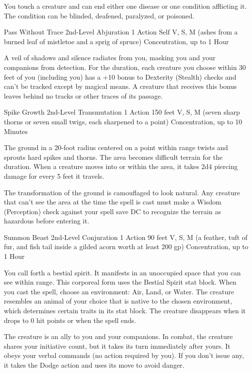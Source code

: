 {You touch a creature and can end either one disease or one condition afflicting it. The condition can be blinded, deafened, paralyzed, or poisoned.

\DndSpellHeader
  {Pass Without Trace}
  {2nd-Level Abjuration}
  {1 Action}
  {Self}
  {V, S, M (ashes from a burned leaf of mistletoe and a sprig of spruce)}
  {Concentration, up to 1 Hour}

A veil of shadows and silence radiates from you, masking you and your companions from detection. For the duration, each creature you choose within 30 feet of you (including you) has a +10 bonus to Dexterity (Stealth) checks and can’t be tracked except by magical means. A creature that receives this bonus leaves behind no tracks or other traces of its passage.

\DndSpellHeader
  {Spike Growth}
  {2nd-Level Transmutation}
  {1 Action}
  {150 feet}
  {V, S, M (seven sharp thorns or seven small twigs, each sharpened to a point)}
  {Concentration, up to 10 Minutes}

The ground in a 20-foot radius centered on a point within range twists and sprouts hard spikes and thorns. The area becomes difficult terrain for the duration. When a creature moves into or within the area, it takes 2d4 piercing damage for every 5 feet it travels.

The transformation of the ground is camouflaged to look natural. Any creature that can’t see the area at the time the spell is cast must make a Wisdom (Perception) check against your spell save DC to recognize the terrain as hazardous before entering it.

\DndSpellHeader
  {Summon Beast}
  {2nd-Level Conjuration}
  {1 Action}
  {90 feet}
  {V, S, M (a feather, tuft of fur, and fish tail inside a gilded acorn worth at least 200 gp)}
  {Concentration, up to 1 Hour}

You call forth a bestial spirit. It manifests in an unoccupied space that you can see within range. This corporeal form uses the Bestial Spirit stat block. When you cast the spell, choose an environment: Air, Land, or Water. The creature resembles an animal of your choice that is native to the chosen environment, which determines certain traits in its stat block. The creature disappears when it drops to 0 hit points or when the spell ends.

The creature is an ally to you and your companions. In combat, the creature shares your initiative count, but it takes its turn immediately after yours. It obeys your verbal commands (no action required by you). If you don’t issue any, it takes the Dodge action and uses its move to avoid danger.

}
